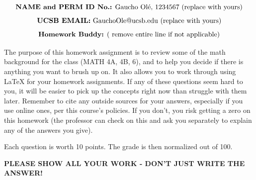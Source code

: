 \documentclass[11pt]{article}
\begin{document}
\noindent{}
$$\mbox{\textbf {NAME and PERM ID No.:} Gaucho Ol\'e, 1234567 (replace with yours)}$$
$$\mbox{\textbf {UCSB EMAIL:} GauchoOle@ucsb.edu (replace with yours)}$$
$$\mbox{\textbf {Homework Buddy:} ( remove entire line if not applicable)}$$

\medskip

The purpose of this homework assignment is to review some of the math background for the class (MATH 4A, 4B, 6), and to help you decide if there is anything you want to brush up on. 
It also allows you to work through using LaTeX for your homework assignments.
If any of these questions seem hard to you, it will be easier to pick up the concepts right now than struggle with them later. 
Remember to cite any outside sources for your answers, especially if you use online ones, per this course's policies. If you don't, you risk getting a zero on this homework (the professor can check on this and ask you separately to explain any of the answers you give).

Each question is worth 10 points. The grade is then normalized out of 100.

\vspace{1 em}
\textbf{PLEASE SHOW ALL YOUR WORK - DON'T JUST WRITE THE ANSWER!}
\vspace{2 em}
\end{document}
